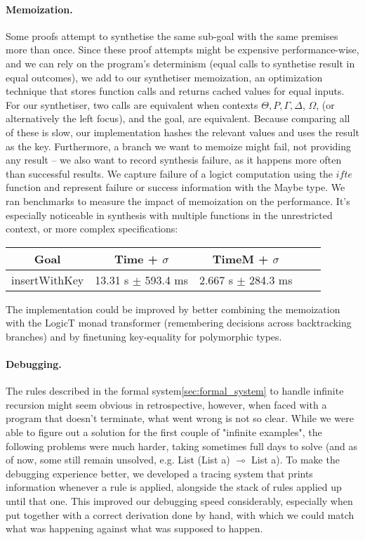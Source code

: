 \documentclass{llncs}
\newcommand{\lolli}{\multimap}
\newcommand{\mypara}[1]{\paragraph{\textbf{#1}.}}
\def\Rho{P}
\begin{document}
\mypara{Memoization} Some proofs attempt to synthetise the same sub-goal with
the same premises more than once. Since these proof attempts might be expensive
performance-wise, and we can rely on the program's determinism (equal calls to
synthetise result in equal outcomes), we add to our synthetiser memoization, an
optimization technique that stores function calls and returns cached values for
equal inputs. For our synthetiser, two calls are equivalent when contexts
$\Theta, \Rho, \Gamma, \Delta$, $\Omega$, (or alternatively the left focus), and
the goal, are equivalent. Because comparing all of these is slow, our
implementation hashes the relevant values and uses the result as the key.
Furthermore, a branch we want to memoize might fail, not providing any result --
we also want to record synthesis failure, as it happens more often than
successful results. We capture failure of a logict computation using the $ifte$
function and represent failure or success information with the Maybe type. We
ran benchmarks to measure the impact of memoization on the performance. It's
especially noticeable in synthesis with multiple functions in the unrestricted
context, or more complex specifications:
%
\begin{center}
    \begin{tabular}{ |c|c|c|c|c| }
        \hline
        Goal & Time + $\sigma$ & TimeM + $\sigma$ \\
        \hline
        insertWithKey & 13.31 s $\pm$ 593.4 ms & 2.667 s $\pm$ 284.3 ms \\
        \hline
    \end{tabular}
\end{center}
%
The implementation could be improved by better combining the
memoization with the LogicT monad transformer (remembering decisions across
backtracking branches) and by finetuning key-equality for polymorphic types.



\mypara{Debugging} The rules described in the formal
system\ref{sec:formal_system} to handle infinite recursion might seem obvious in
retrospective, however, when faced with a program that doesn't terminate, what
went wrong is not so clear. While we were able to figure out a solution for the
first couple of "infinite examples", the following problems were much harder,
taking sometimes full days to solve (and as of now, some still remain unsolved,
e.g. List (List a) $\lolli$ List a). To make the debugging experience better, we
developed a tracing system that prints information whenever a rule is applied,
alongside the stack of rules applied up until that one. This improved our
debugging speed considerably, especially when put together with a correct
derivation done by hand, with which we could match what was happening against
what was supposed to happen.
\end{document}
